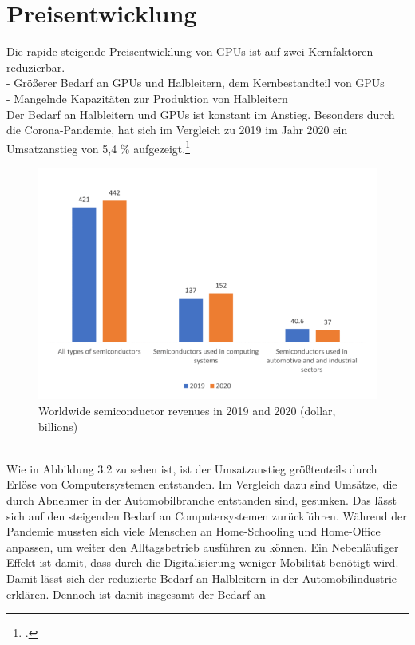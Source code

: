 \documentclass[12pt,toc=bib,toc=listof]{scrreprt}
\begin{document}
\section{Preisentwicklung}
\label{sec:Preisentwicklung}

Die rapide steigende Preisentwicklung von GPUs ist auf zwei Kernfaktoren reduzierbar.\\
- Größerer Bedarf an GPUs und Halbleitern, dem Kernbestandteil von GPUs\\ %
- Mangelnde Kapazitäten zur Produktion von Halbleitern\\
Der Bedarf an Halbleitern und GPUs ist konstant im Anstieg. Besonders durch die Corona-Pandemie,
hat sich im Vergleich zu 2019 im Jahr 2020 ein Umsatzanstieg von 5,4 \% aufgezeigt.\footcite [Vgl.] []{Voas.2021}
\begin{figure}[h]
  \centering
  \includegraphics[scale=0.9]{Abbildungen/voas1.png} %
  \caption[Voas, Kshetri und DeFranco (2021)]{Worldwide semiconductor revenues in 2019 and 2020 (dollar, billions)}
\end{figure}
\\Wie in Abbildung 3.2 zu sehen ist, ist der Umsatzanstieg größtenteils durch Erlöse von Computersystemen entstanden.
Im Vergleich dazu sind Umsätze, die durch Abnehmer in der Automobilbranche entstanden sind, gesunken.
Das lässt sich auf den steigenden Bedarf an Computersystemen zurückführen. Während der Pandemie mussten sich
viele Menschen an Home-Schooling und Home-Office anpassen, um weiter den Alltagsbetrieb ausführen zu können.
Ein Nebenläufiger Effekt ist damit, dass durch die Digitalisierung weniger Mobilität benötigt wird.
Damit lässt sich der reduzierte Bedarf an Halbleitern in der Automobilindustrie erklären. Dennoch ist damit insgesamt der Bedarf an 
\end{document}
